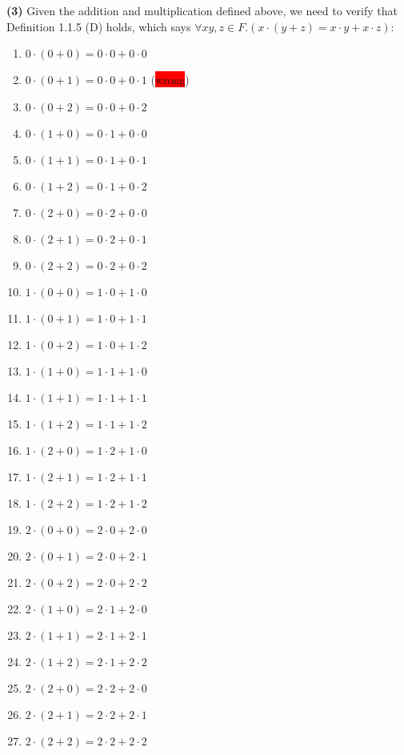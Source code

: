 \documentclass[12pt, letterpaper, oneside]{book}
\begin{document}
\textbf{(3)} Given the addition and multiplication defined above, we need to verify that Definition 1.1.5 (D) holds,
which says $\forall x y, z \in F. (x \cdot (y + z) = x \cdot y + x \cdot z)$:
\begin{enumerate}
  \item $0 \cdot (0 + 0) = 0 \cdot 0 + 0 \cdot 0$
  \item $0 \cdot (0 + 1) = 0 \cdot 0 + 0 \cdot 1$ (\colorbox{red}{wrong})
  \item $0 \cdot (0 + 2) = 0 \cdot 0 + 0 \cdot 2$
  \item $0 \cdot (1 + 0) = 0 \cdot 1 + 0 \cdot 0$
  \item $0 \cdot (1 + 1) = 0 \cdot 1 + 0 \cdot 1$
  \item $0 \cdot (1 + 2) = 0 \cdot 1 + 0 \cdot 2$
  \item $0 \cdot (2 + 0) = 0 \cdot 2 + 0 \cdot 0$
  \item $0 \cdot (2 + 1) = 0 \cdot 2 + 0 \cdot 1$
  \item $0 \cdot (2 + 2) = 0 \cdot 2 + 0 \cdot 2$
  \item $1 \cdot (0 + 0) = 1 \cdot 0 + 1 \cdot 0$
  \item $1 \cdot (0 + 1) = 1 \cdot 0 + 1 \cdot 1$
  \item $1 \cdot (0 + 2) = 1 \cdot 0 + 1 \cdot 2$
  \item $1 \cdot (1 + 0) = 1 \cdot 1 + 1 \cdot 0$
  \item $1 \cdot (1 + 1) = 1 \cdot 1 + 1 \cdot 1$
  \item $1 \cdot (1 + 2) = 1 \cdot 1 + 1 \cdot 2$
  \item $1 \cdot (2 + 0) = 1 \cdot 2 + 1 \cdot 0$
  \item $1 \cdot (2 + 1) = 1 \cdot 2 + 1 \cdot 1$
  \item $1 \cdot (2 + 2) = 1 \cdot 2 + 1 \cdot 2$
  \item $2 \cdot (0 + 0) = 2 \cdot 0 + 2 \cdot 0$
  \item $2 \cdot (0 + 1) = 2 \cdot 0 + 2 \cdot 1$
  \item $2 \cdot (0 + 2) = 2 \cdot 0 + 2 \cdot 2$
  \item $2 \cdot (1 + 0) = 2 \cdot 1 + 2 \cdot 0$
  \item $2 \cdot (1 + 1) = 2 \cdot 1 + 2 \cdot 1$
  \item $2 \cdot (1 + 2) = 2 \cdot 1 + 2 \cdot 2$
  \item $2 \cdot (2 + 0) = 2 \cdot 2 + 2 \cdot 0$
  \item $2 \cdot (2 + 1) = 2 \cdot 2 + 2 \cdot 1$
  \item $2 \cdot (2 + 2) = 2 \cdot 2 + 2 \cdot 2$
\end{enumerate}
\end{document}

